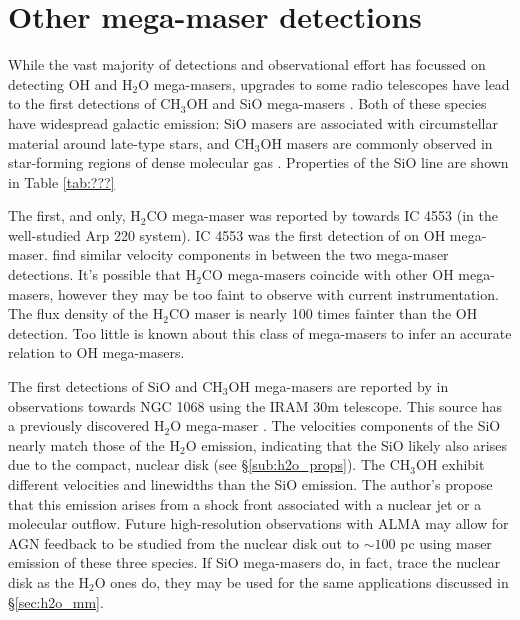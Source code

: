\section{Other mega-maser detections}
\label{sec:other}

While the vast majority of detections and observational effort has focussed on detecting OH and H$_2$O mega-masers, upgrades to some radio telescopes have lead to the first detections of CH$_3$OH and SiO mega-masers \citep{wang2014_SiO_CH3OH, chen_methanol_2015}. Both of these species have widespread galactic emission: SiO masers are associated with circumstellar material around late-type stars, and CH$_3$OH masers are commonly observed in star-forming regions of dense molecular gas \citep{Elitzur_1992}. Properties of the SiO line are shown in Table \ref{tab:???}

The first, and only, H$_2$CO mega-maser was reported by \citet{baan1986} towards IC 4553 (in the well-studied Arp 220 system). IC 4553 was the first detection of on OH mega-maser. \citet{baan1986} find similar velocity components in between the two mega-maser detections. It's possible that H$_2$CO mega-masers coincide with other OH mega-masers, however they may be too faint to observe with current instrumentation. The flux density of the H$_2$CO maser is nearly 100 times fainter than the OH detection. Too little is known about this class of mega-masers to infer an accurate relation to OH mega-masers.

The first detections of SiO and CH$_{3}$OH mega-masers are reported by \citet{wang2014_SiO_CH3OH} in observations towards NGC 1068 using the IRAM 30m telescope. This source has a previously discovered H$_2$O mega-maser \citep{Gallimore_2001}. The velocities components of the SiO nearly match those of the H$_2$O emission, indicating that the SiO likely also arises due to the compact, nuclear disk (see \S\ref{sub:h2o_props}). The CH$_3$OH exhibit different velocities and linewidths than the SiO emission. The author's propose that this emission arises from a shock front associated with a nuclear jet or a molecular outflow. Future high-resolution observations with ALMA may allow for AGN feedback to be studied from the nuclear disk out to $\sim 100$ pc using maser emission of these three species. If SiO mega-masers do, in fact, trace the nuclear disk as the H$_2$O ones do, they may be used for the same applications discussed in \S\ref{sec:h2o_mm}. 

